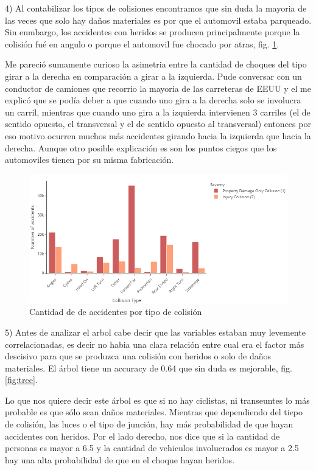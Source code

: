 \documentclass[12pt]{article}
\begin{document}
  4) Al contabilizar los tipos de colisiones encontramos que sin duda la mayoria de las veces que solo hay daños materiales es por que el automovil estaba parqueado. Sin enmbargo, los accidentes con heridos se producen principalmente porque la colisión fué en angulo o porque el automovil fue chocado por atras, fig. \ref{fig:collitiotype}. 

  Me pareció sumamente curioso la asimetria entre la cantidad de choques del tipo girar a la derecha en comparación a girar a la izquierda. Pude conversar con un conductor de camiones que recorrio la mayoria de las carreteras de EEUU y el me explicó que se podía deber a que cuando uno gira a la derecha solo se involucra un carril, mientras que cuando uno gira a la izquierda intervienen 3 carriles (el de sentido opuesto, el transversal y el de sentido opuesto al transversal) entonces por eso motivo ocurren muchos más accidentes girando hacia la izquierda que hacia la derecha. Aunque otro posible explicación es son los puntos ciegos que los automoviles tienen por su misma fabricación. \\


  \begin{figure}[htbp]
    \centering
      \includegraphics[width=1\textwidth]{../images/collition_type.png}
    \caption{Cantidad de de accidentes por tipo de colisión}
    \label{fig:collitiotype}
  \end{figure}
  5) Antes de analizar el arbol cabe decir que las variables estaban muy levemente correlacionadas, es decir no habia una clara relación entre cual era el factor más descisivo para que se produzca una colisión con heridos o solo de daños materiales.  El árbol tiene un accuracy de 0.64 que sin duda es mejorable, fig. \ref{fig:tree}.

  Lo que nos quiere decir este árbol es que si no hay ciclistas, ni transeuntes lo más probable es que sólo sean daños materiales. Mientras que dependiendo del tiepo de colisión, las luces o el tipo de junción, hay más probabilidad de que hayan accidentes con heridos. Por el lado derecho, nos dice que si la cantidad de personas es mayor a 6.5 y la cantidad de vehiculos involucrados es mayor a 2.5 hay una alta probabilidad de que en el choque hayan heridos.\\
\end{document}
